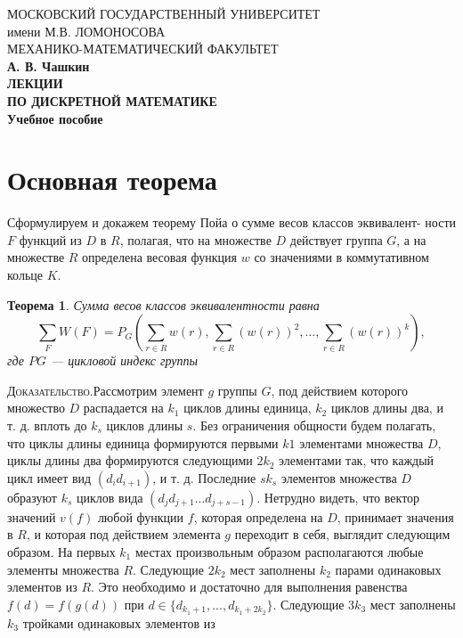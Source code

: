 \documentclass[12pt]{article}
\numberwithin{equation}{section} %
\begin{document}
\begin{titlepage}
\begin{center}
\large
МОСКОВСКИЙ ГОСУДАРСТВЕННЫЙ УНИВЕРСИТЕТ \\
имени М.В. ЛОМОНОСОВА \\
МЕХАНИКО-МАТЕМАТИЧЕСКИЙ ФАКУЛЬТЕТ\\ 

\bf А. В. Чашкин \\
\Large 
ЛЕКЦИИ\\
ПО ДИСКРЕТНОЙ МАТЕМАТИКЕ\\
\normalsize
Учебное пособие
\end{center}
\end{titlepage}   
\newpage
\tableofcontents %
\newpage
\section{Основная теорема}
 Сформулируем и докажем теорему Пойа о сумме весов классов эквивалент-
ности $F$ функций из $D$ в $R$, полагая, что на множестве $D$ действует группа $G$, а на множестве $R$ определена весовая функция $w$ со значениями в коммутативном кольце $K$.
\newtheorem{Th}{Теорема}
\begin{Th}\label{thViet}
Сумма весов классов эквивалентности равна
$$ \sum_F W(F)=P_G \left(\sum_{r\in R}w(r),\sum_{r\in R}(w(r))^2,\dots
,\sum_{r\in R}(w(r))^k\right),$$
где $PG$ — цикловой индекс группы
\end{Th}
{\scshape Доказательство}.Рассмотрим элемент $g$ группы $G$, под действием которого множество $D$ распадается на $k_1$ циклов длины единица, $k_2$ циклов длины два, и т. д. вплоть до $k_s$ циклов длины $s$. Без ограничения общности будем полагать, что циклы длины единица формируются первыми $k1$ элементами множества $D$, циклы длины два формируются следующими $2k_2$ элементами так, что каждый цикл имеет вид $(d_id_{i+1})$, и т. д. Последние $s k_s$ элементов множества
$D$ образуют $k_s$ циклов вида $(d_j d_{j+1} \dots d_{j+s-1})$.
Нетрудно видеть, что вектор значений $v(f)$ любой функции $f$, которая определена на $D$, принимает значения в $R$, и которая под действием элемента $g$ переходит в себя, выглядит следующим образом. На первых $k_1$ местах произвольным образом располагаются любые элементы множества
$R$. Следующие $2k_2$ мест заполнены $k_2$ парами одинаковых элементов из
$R$. Это необходимо и достаточно для выполнения равенства
$f(d) =f(g(d))$ при $d \in \{d_{k_1+1},...,d_{k_1+2k_2}\}$. Следующие $3k_3$ мест заполнены $k_3$ тройками одинаковых элементов из
\end{document}
